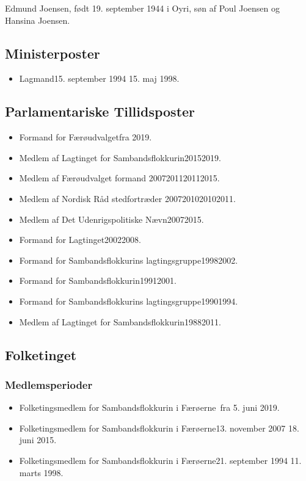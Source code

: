 \documentclass[11pt, a4paper]{awesome-cv}
\begin{document}
\makecvheader[R]
\makelettertitle
\begin{cvletter}
Edmund Joensen, født 19. september 1944 i Oyri, søn af Poul Joensen og Hansina Joensen.

\subsection*{Ministerposter}
\begin{itemize}
\item Lagmand15. september 1994  15. maj 1998.
\end{itemize}
\subsection*{Parlamentariske Tillidsposter}
\begin{itemize}
\item Formand for Færøudvalgetfra 2019.
\item Medlem af Lagtinget for Sambandsflokkurin20152019.
\item Medlem af Færøudvalget formand 2007201120112015.
\item Medlem af Nordisk Råd stedfortræder 2007201020102011.
\item Medlem af Det Udenrigspolitiske Nævn20072015.
\item Formand for Lagtinget20022008.
\item Formand for Sambandsflokkurins lagtingsgruppe19982002.
\item Formand for Sambandsflokkurin19912001.
\item Formand for Sambandsflokkurins lagtingsgruppe19901994.
\item Medlem af Lagtinget for Sambandsflokkurin19882011.
\end{itemize}
\subsection*{Folketinget}
\subsubsection*{Medlemsperioder}
\begin{itemize}
\item Folketingsmedlem for Sambandsflokkurin i Færøerne fra 5. juni 2019.
\item Folketingsmedlem for Sambandsflokkurin i Færøerne13. november 2007  18. juni 2015.
\item Folketingsmedlem for Sambandsflokkurin i Færøerne21. september 1994  11. marts 1998.
\end{itemize}

\end{cvletter}
\end{document}
